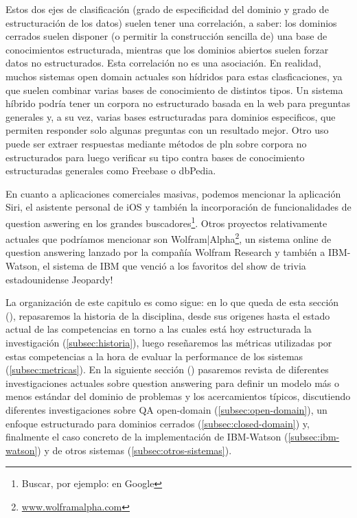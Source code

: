 Estos dos ejes de clasificación (grado de especificidad del dominio y grado de estructuración de los datos) suelen tener una correlación, a saber: los dominios cerrados suelen disponer (o permitir la construcción sencilla de) una base de conocimientos estructurada, mientras que los dominios abiertos suelen forzar datos no estructurados. Esta correlación no es una asociación. En realidad, muchos sistemas open domain actuales son hídridos para estas clasficaciones, ya que suelen combinar varias bases de conocimiento de distintos tipos. Un sistema híbrido podría tener un corpora no estructurado basada en la web para preguntas generales y, a su vez, varias bases estructuradas para dominios especificos, que permiten responder solo algunas preguntas con un resultado mejor. Otro uso puede ser extraer respuestas mediante métodos de pln sobre corpora no estructurados para luego verificar su tipo contra bases de conocimiento estructuradas generales como Freebase o dbPedia. 

En cuanto a aplicaciones comerciales masivas, podemos mencionar la aplicación Siri, el asistente personal de iOS y también la incorporación de funcionalidades de question aswering en los grandes buscadores\footnote{Buscar, por ejemplo:  en Google}.  Otros proyectos relativamente actuales que podríamos mencionar son Wolfram|Alpha\footnote{\url{www.wolframalpha.com}}, un sistema online de question answering lanzado por la compañía Wolfram Research y también a IBM-Watson, el sistema de IBM que venció a los favoritos del show de trivia estadounidense Jeopardy!

La organización de este capitulo es como sigue: en lo que queda de esta sección (), repasaremos la historia de la disciplina, desde sus origenes hasta el estado actual de las competencias en torno a las cuales está hoy estructurada la investigación (\ref{subsec:historia}), luego reseñaremos las métricas utilizadas por estas competencias a la hora de evaluar la performance de los sistemas (\ref{subsec:metricas}). En la siguiente sección () pasaremos revista de diferentes investigaciones actuales sobre question answering para definir un modelo más o menos estándar del dominio de problemas y los acercamientos típicos, discutiendo diferentes investigaciones sobre QA open-domain (\ref{subsec:open-domain}), un enfoque estructurado para dominios cerrados (\ref{subsec:closed-domain}) y, finalmente el caso concreto de la implementación de IBM-Watson (\ref{subsec:ibm-watson}) y de otros sistemas  (\ref{subsec:otros-sistemas}).


